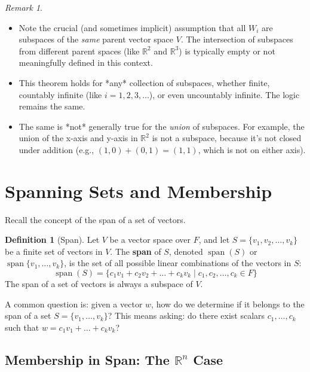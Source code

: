 \documentclass[11pt]{article}
\theoremstyle{definition}
\newtheorem{definition}[theorem]{Definition}
\theoremstyle{remark}
\newtheorem{remark}[theorem]{Remark}
\begin{document}
\begin{remark}
\begin{itemize}
    \item Note the crucial (and sometimes implicit) assumption that all $W_i$ are subspaces of the \emph{same} parent vector space $V$. The intersection of subspaces from different parent spaces (like $\mathbb{R}^2$ and $\mathbb{R}^3$) is typically empty or not meaningfully defined in this context.
    \item This theorem holds for *any* collection of subspaces, whether finite, countably infinite (like $i=1, 2, 3, \dots$), or even uncountably infinite. The logic remains the same.
    \item The same is *not* generally true for the \emph{union} of subspaces. For example, the union of the x-axis and y-axis in $\mathbb{R}^2$ is not a subspace, because it's not closed under addition (e.g., $(1,0) + (0,1) = (1,1)$, which is not on either axis).
\end{itemize}
\end{remark}

\section{Spanning Sets and Membership}

Recall the concept of the span of a set of vectors.

\begin{definition}[Span]
Let $V$ be a vector space over $F$, and let $S = \{v_1, v_2, \dots, v_k\}$ be a finite set of vectors in $V$. The \textbf{span} of $S$, denoted $\operatorname{span}(S)$ or $\operatorname{span}\{v_1, \dots, v_k\}$, is the set of all possible linear combinations of the vectors in $S$:
\[ \operatorname{span}(S) = \{ c_1 v_1 + c_2 v_2 + \dots + c_k v_k \mid c_1, c_2, \dots, c_k \in F \} \]
The span of a set of vectors is always a subspace of $V$.
\end{definition}

A common question is: given a vector $w$, how do we determine if it belongs to the span of a set $S = \{v_1, \dots, v_k\}$? This means asking: do there exist scalars $c_1, \dots, c_k$ such that $w = c_1 v_1 + \dots + c_k v_k$?

\subsection{Membership in Span: The $\mathbb{R}^n$ Case}
\end{document}
